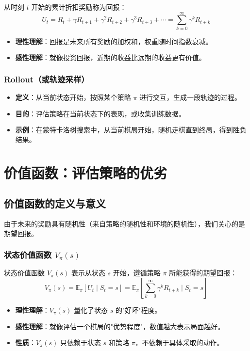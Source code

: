 \begin{definition}[回报（Return）]
从时刻 $t$ 开始的累计折扣奖励称为回报：
\[
U_t = R_t + \gamma R_{t+1} + \gamma^2 R_{t+2} + \gamma^3 R_{t+3} + \cdots = \sum_{k=0}^{\infty} \gamma^k R_{t+k}
\]
\begin{itemize}
    \item \textbf{理性理解}：回报是未来所有奖励的加权和，权重随时间指数衰减。
    \item \textbf{感性理解}：就像投资回报，近期的收益比远期的收益更有价值。
\end{itemize}
\end{definition}

\subsubsection{Rollout（或轨迹采样）}
\begin{itemize}
    \item \textbf{定义}：从当前状态开始，按照某个策略 $\pi$ 进行交互，生成一段轨迹的过程。
    \item \textbf{目的}：评估策略在当前状态下的表现，或收集训练数据。
    \item \textbf{示例}：在蒙特卡洛树搜索中，从当前棋局开始，随机走棋直到终局，得到胜负结果。
\end{itemize}

\section{价值函数：评估策略的优劣}

\subsection{价值函数的定义与意义}

由于未来的奖励具有随机性（来自策略的随机性和环境的随机性），我们关心的是期望回报。

\subsubsection{状态价值函数 $V_\pi(s)$}

\begin{definition}[状态价值函数]
状态价值函数 $V_\pi(s)$ 表示从状态 $s$ 开始，遵循策略 $\pi$ 所能获得的期望回报：
\[
V_\pi(s) = \mathbb{E}_\pi[U_t \mid S_t = s] = \mathbb{E}_\pi\left[\sum_{k=0}^\infty \gamma^k R_{t+k} \mid S_t = s\right]
\]
\begin{itemize}
    \item \textbf{理性理解}：$V_\pi(s)$ 量化了状态 $s$ 的"好坏"程度。
    \item \textbf{感性理解}：就像评估一个棋局的"优势程度"，数值越大表示局面越好。
    \item \textbf{性质}：$V_\pi(s)$ 只依赖于状态 $s$ 和策略 $\pi$，不依赖于具体采取的动作。
\end{itemize}
\end{definition}

